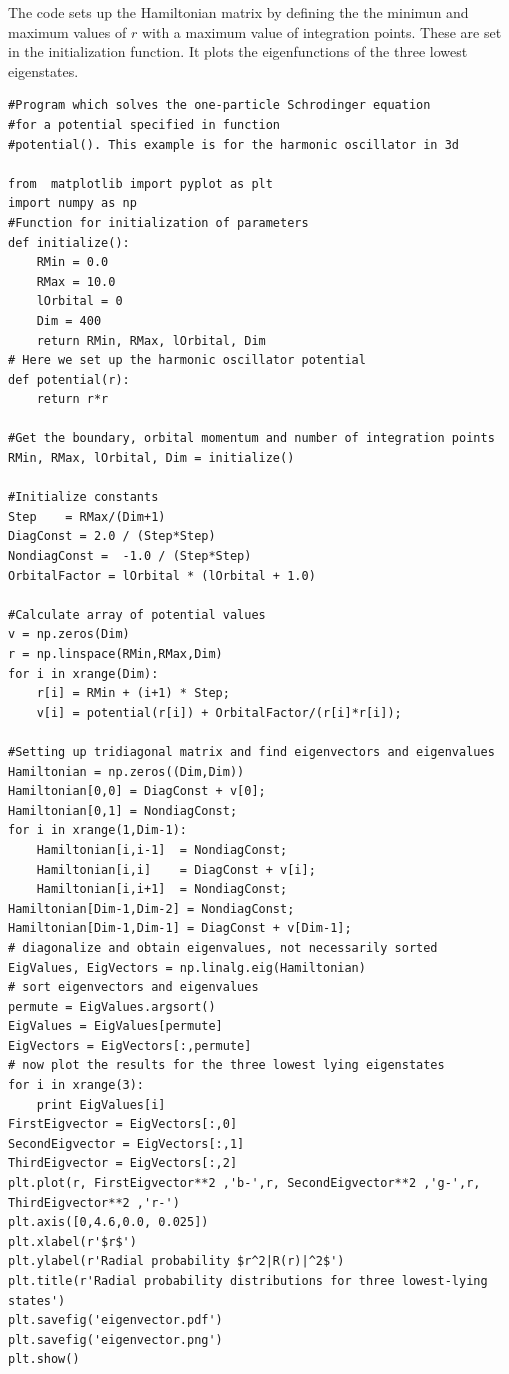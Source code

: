 \documentclass[%
oneside,                 %
final,                   %
10pt]{article}
\begin{document}
\noindent
The code sets up the Hamiltonian matrix by defining the the minimun and maximum values of $r$ with a
maximum value of integration points.  These are set in the initialization function. It plots the 
eigenfunctions of the three lowest eigenstates.
\begin{verbatim}
#Program which solves the one-particle Schrodinger equation 
#for a potential specified in function
#potential(). This example is for the harmonic oscillator in 3d

from  matplotlib import pyplot as plt
import numpy as np
#Function for initialization of parameters
def initialize():
    RMin = 0.0
    RMax = 10.0
    lOrbital = 0
    Dim = 400
    return RMin, RMax, lOrbital, Dim
# Here we set up the harmonic oscillator potential
def potential(r):
    return r*r

#Get the boundary, orbital momentum and number of integration points
RMin, RMax, lOrbital, Dim = initialize()

#Initialize constants
Step    = RMax/(Dim+1)
DiagConst = 2.0 / (Step*Step)
NondiagConst =  -1.0 / (Step*Step)
OrbitalFactor = lOrbital * (lOrbital + 1.0)

#Calculate array of potential values
v = np.zeros(Dim)
r = np.linspace(RMin,RMax,Dim)
for i in xrange(Dim):
    r[i] = RMin + (i+1) * Step;
    v[i] = potential(r[i]) + OrbitalFactor/(r[i]*r[i]);

#Setting up tridiagonal matrix and find eigenvectors and eigenvalues
Hamiltonian = np.zeros((Dim,Dim))
Hamiltonian[0,0] = DiagConst + v[0];
Hamiltonian[0,1] = NondiagConst;
for i in xrange(1,Dim-1):
    Hamiltonian[i,i-1]  = NondiagConst;
    Hamiltonian[i,i]    = DiagConst + v[i];
    Hamiltonian[i,i+1]  = NondiagConst;
Hamiltonian[Dim-1,Dim-2] = NondiagConst;
Hamiltonian[Dim-1,Dim-1] = DiagConst + v[Dim-1];
# diagonalize and obtain eigenvalues, not necessarily sorted
EigValues, EigVectors = np.linalg.eig(Hamiltonian)
# sort eigenvectors and eigenvalues
permute = EigValues.argsort()
EigValues = EigValues[permute]
EigVectors = EigVectors[:,permute]
# now plot the results for the three lowest lying eigenstates
for i in xrange(3):
    print EigValues[i]
FirstEigvector = EigVectors[:,0]
SecondEigvector = EigVectors[:,1]
ThirdEigvector = EigVectors[:,2]
plt.plot(r, FirstEigvector**2 ,'b-',r, SecondEigvector**2 ,'g-',r, ThirdEigvector**2 ,'r-')
plt.axis([0,4.6,0.0, 0.025])
plt.xlabel(r'$r$')
plt.ylabel(r'Radial probability $r^2|R(r)|^2$')
plt.title(r'Radial probability distributions for three lowest-lying states')
plt.savefig('eigenvector.pdf')
plt.savefig('eigenvector.png')
plt.show()

\end{verbatim}
\end{document}
